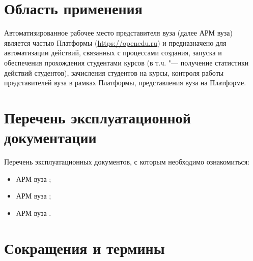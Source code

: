 \section{Область применения}
Автоматизированное рабочее место представителя вуза (далее АРМ вуза) является частью Платформы 
 (\url{https://openedu.ru}) и предназначено для автоматизации действий, 
связанных с процессами создания, запуска и обеспечения прохождения студентами курсов (в т.ч. "--- получение статистики
действий студентов), зачисления студентов на курсы, контроля работы представителей вуза в рамках Платформы, 
представления вуза на Платформе.

\section{Перечень эксплуатационной документации}

Перечень эксплуатационных документов, с которым необходимо ознакомиться:
\begin{itemize}
	\item АРМ вуза ;
	\item АРМ вуза ;
	\item АРМ вуза .
\end{itemize}

\section{Сокращения и термины}

